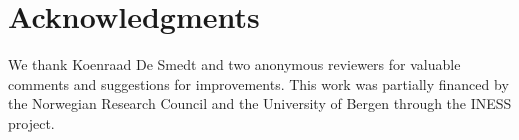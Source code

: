 \documentclass[output=paper]{langsci/langscibook}
\begin{document}
\section*{Acknowledgments}
We thank Koenraad De Smedt and two anonymous reviewers for valuable comments and suggestions for improvements.
This work was partially financed by the Norwegian Research Council and the University of Bergen through the INESS project.

 


\printbibliography[heading=subbibliography,notkeyword=this]
\end{document}
